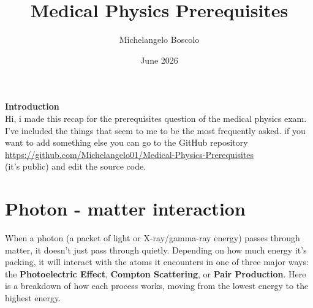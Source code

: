 \documentclass{article}
\title{\textbf{Medical Physics Prerequisites}}
\author{Michelangelo Boscolo}
\date{June 2026}
\begin{document}
\maketitle

\begin{center}
    {\Large \textbf{Introduction}} \\
    \vspace{0.5cm}
    Hi, i made this recap for the prerequisites question of the medical physics exam. I've included the things that seem to me to be the most frequently asked. if you want to add something else you can go to the GitHub repository \\ \url{https://github.com/Michelangelo01/Medical-Physics-Prerequisites} \\
    (it's public) and edit the source code.
\end{center}

\vspace{3cm}

\section{Photon - matter interaction}

When a photon (a packet of light or X-ray/gamma-ray energy) passes through matter, it doesn't just pass through quietly. Depending on how much energy it’s packing, it will interact with the atoms it encounters in one of three major ways: the \textbf{Photoelectric Effect}, \textbf{Compton Scattering}, or \textbf{Pair Production}.  Here is a breakdown of how each process works, moving from the lowest energy to the highest energy.
\end{document}
